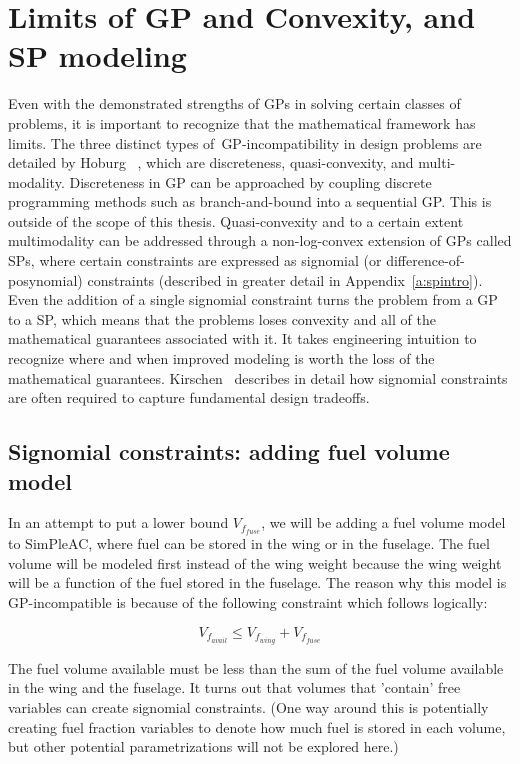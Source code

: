 \section{Limits of GP and Convexity, and SP modeling}
\label{s:GPlimits}

Even with the demonstrated strengths of \gls{GP}s in solving certain classes of
problems, it is important to recognize that the mathematical framework has limits.
The three distinct types of~\gls{GP}-incompatibility in design problems are detailed
by Hoburg~ \cite{hoburg_thesis}, which are discreteness,
quasi-convexity, and multi-modality. Discreteness in \gls{GP} can be approached
by coupling discrete programming methods such as branch-and-bound into a sequential
\gls{GP}. This is outside of the scope of this thesis.
Quasi-convexity and to a certain extent multimodality can
be addressed through a non-log-convex extension of \gls{GP}s called \gls{SP}s, where
certain constraints are expressed as signomial (or difference-of-posynomial) constraints
(described in greater detail in Appendix~\ref{a:spintro}).
Even the addition of a single
signomial constraint turns the problem from a \gls{GP} to a \gls{SP}, which means
that the problems loses convexity and all of the mathematical guarantees associated with it. 
It takes engineering intuition to recognize where and when improved modeling is worth
the loss of the mathematical guarantees. Kirschen~\cite{kirschen_thesis} describes in detail how
signomial constraints are often required to capture fundamental design tradeoffs.

\subsection{Signomial constraints: adding fuel volume model}
\label{s:fuel}

In an attempt to put a lower bound $V_{f_{fuse}}$, we will
be adding a fuel volume model to SimPleAC, where fuel can be stored in the wing or
in the fuselage. The fuel volume will be modeled first instead of the wing
weight because the wing weight will be a function of the fuel stored in the fuselage.
The reason why this model is \gls{GP}-incompatible is because of the
following constraint which follows logically:

\begin{equation}
	V_{f_{avail}} \leq V_{f_{wing}} + V_{f_{fuse}}
	\label{vfavail}
\end{equation}

The fuel volume available must be less than the sum of the fuel volume available in the
wing and the fuselage. It turns out that volumes that 'contain' free variables
can create signomial constraints. (One way around this is potentially creating fuel
fraction variables to denote how much fuel is stored in each volume, but
other potential parametrizations will not be explored here.)

